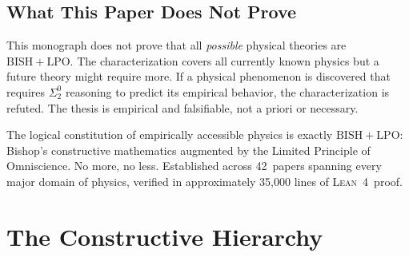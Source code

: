 \documentclass[11pt,a4paper]{report}
\theoremstyle{plain}
\theoremstyle{definition}
\theoremstyle{remark}
\newcommand{\BISH}{\mathrm{BISH}}
\newcommand{\LPO}{\mathrm{LPO}}
\newcommand{\Lean}{\textsc{Lean~4}}
\begin{document}
\section{What This Paper Does Not Prove}

This monograph does not prove that all \emph{possible} physical theories are $\BISH+\LPO$. The characterization covers all currently known physics but a future theory might require more. If a physical phenomenon is discovered that requires $\Sigma^0_2$ reasoning to predict its empirical behavior, the characterization is refuted. The thesis is empirical and falsifiable, not a priori or necessary.

\begin{chapterbox}
The logical constitution of empirically accessible physics is exactly $\BISH+\LPO$: Bishop's constructive mathematics augmented by the Limited Principle of Omniscience. No more, no less. Established across 42~papers spanning every major domain of physics, verified in approximately 35{,}000 lines of \Lean\ proof.
\end{chapterbox}

\chapter{The Constructive Hierarchy}
\end{document}
